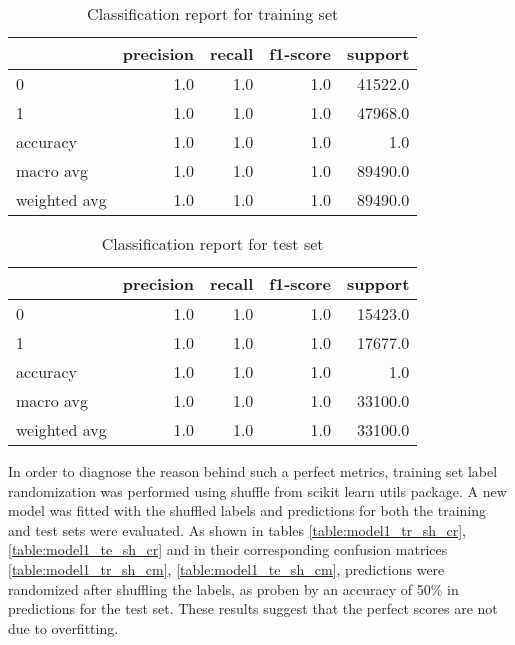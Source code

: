 \documentclass{article}
\begin{document}
\begin{itemize}
\begin{table}[h!]
\centering
\begin{tabular}{lrrrr}
\toprule
{} &  precision &  recall &  f1-score &  support \\
\midrule
0            &        1.0 &     1.0 &       1.0 &  41522.0 \\
1            &        1.0 &     1.0 &       1.0 &  47968.0 \\
accuracy     &        1.0 &     1.0 &       1.0 &      1.0 \\
macro avg    &        1.0 &     1.0 &       1.0 &  89490.0 \\
weighted avg &        1.0 &     1.0 &       1.0 &  89490.0 \\
\bottomrule
\end{tabular}
\caption{Classification report for training set}
\label{table:model1_tr_cr}
\end{table}

\begin{table}[h!]
\centering
\begin{tabular}{lrrrr}
\toprule
{} &  precision &  recall &  f1-score &  support \\
\midrule
0            &        1.0 &     1.0 &       1.0 &  15423.0 \\
1            &        1.0 &     1.0 &       1.0 &  17677.0 \\
accuracy     &        1.0 &     1.0 &       1.0 &      1.0 \\
macro avg    &        1.0 &     1.0 &       1.0 &  33100.0 \\
weighted avg &        1.0 &     1.0 &       1.0 &  33100.0 \\
\bottomrule
\end{tabular}
\caption{Classification report for test set}
\label{table:model1_te_cr}
\end{table}

In order to diagnose the reason behind such a perfect metrics, training set label randomization was performed using shuffle from scikit learn utils package. A new model was fitted with the shuffled labels and predictions for both the training and test sets were evaluated. As shown in tables \ref{table:model1_tr_sh_cr}, \ref{table:model1_te_sh_cr} and in their corresponding confusion matrices  \ref{table:model1_tr_sh_cm}, \ref{table:model1_te_sh_cm}, predictions were randomized after shuffling the labels, as proben by an accuracy of  50\% in predictions for the test set. These results suggest that the perfect scores are not due to overfitting.
 

\end{itemize}
\end{document}
